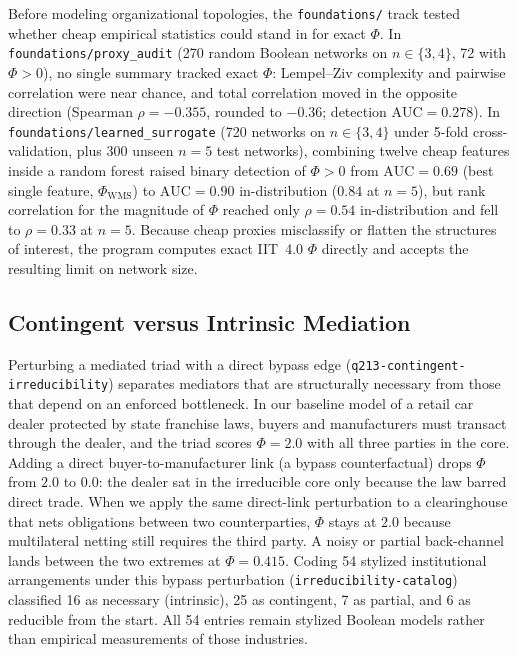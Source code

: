 \documentclass[11pt,a4paper]{article}
\begin{document}
Before modeling organizational topologies, the \texttt{foundations/} track tested whether cheap empirical statistics could stand in for exact $\Phi$. In \texttt{foundations/proxy\_audit} (270 random Boolean networks on $n \in \{3, 4\}$, 72 with $\Phi > 0$), no single summary tracked exact $\Phi$: Lempel--Ziv complexity and pairwise correlation were near chance, and total correlation moved in the opposite direction (Spearman $\rho = -0.355$, rounded to $-0.36$; detection $\mathrm{AUC} = 0.278$). In \texttt{foundations/learned\_surrogate} (720 networks on $n \in \{3, 4\}$ under 5-fold cross-validation, plus 300 unseen $n = 5$ test networks), combining twelve cheap features inside a random forest raised binary detection of $\Phi > 0$ from $\mathrm{AUC} = 0.69$ (best single feature, $\Phi_{\mathrm{WMS}}$) to $\mathrm{AUC} = 0.90$ in-distribution ($0.84$ at $n = 5$), but rank correlation for the magnitude of $\Phi$ reached only $\rho = 0.54$ in-distribution and fell to $\rho = 0.33$ at $n = 5$. Because cheap proxies misclassify or flatten the structures of interest, the program computes exact IIT~4.0 $\Phi$ directly and accepts the resulting limit on network size.

\subsection{Contingent versus Intrinsic Mediation}

Perturbing a mediated triad with a direct bypass edge (\texttt{q213-contingent-irreducibility}) separates mediators that are structurally necessary from those that depend on an enforced bottleneck. In our baseline model of a retail car dealer protected by state franchise laws, buyers and manufacturers must transact through the dealer, and the triad scores $\Phi = 2.0$ with all three parties in the core. Adding a direct buyer-to-manufacturer link (a bypass counterfactual) drops $\Phi$ from $2.0$ to $0.0$: the dealer sat in the irreducible core only because the law barred direct trade. When we apply the same direct-link perturbation to a clearinghouse that nets obligations between two counterparties, $\Phi$ stays at $2.0$ because multilateral netting still requires the third party. A noisy or partial back-channel lands between the two extremes at $\Phi = 0.415$. Coding 54 stylized institutional arrangements under this bypass perturbation (\texttt{irreducibility-catalog}) classified 16 as necessary (intrinsic), 25 as contingent, 7 as partial, and 6 as reducible from the start. All 54 entries remain stylized Boolean models rather than empirical measurements of those industries.
\end{document}
